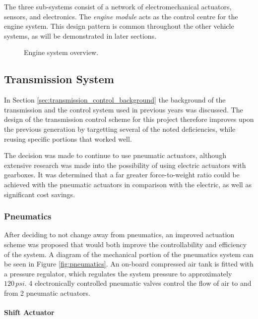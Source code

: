 The three sub-systems consist of a network of electromechanical actuators, sensors, and electronics. The \emph{engine module} acts as the control centre for the engine system. This design pattern is common throughout the other vehicle systems, as will be demonstrated in later sections.

\begin{figure}[H]
	\centering
		
	\caption{Engine system overview.}
	\label{fig:engine_system_overview}
\end{figure}

\subsection{Transmission System}

In Section \ref{sec:transmission_control_background} the background of the transmission and the control system used in previous years was discussed. The design of the transmission control scheme for this project therefore improves upon the previous generation by targetting several of the noted deficiencies, while reusing specific portions that worked well.

The decision was made to continue to use pneumatic actuators, although extensive research was made into the possibility of using electric actuators with gearboxes. It was determined that a far greater force-to-weight ratio could be achieved with the pneumatic actuators in comparison with the electric, as well as significant cost savings.

\subsubsection{Pneumatics}

After deciding to not change away from pneumatics, an improved actuation scheme was proposed that would both improve the controllability and efficiency of the system. A diagram of the mechanical portion of the pneumatics system can be seen in Figure \ref{fig:pneumatics}. An on-board compressed air tank is fitted with a pressure regulator, which regulates the system pressure to approximately $120\,psi$. 4 electronically controlled pneumatic valves control the flow of air to and from 2 pneumatic actuators.

\paragraph{Shift Actuator}

